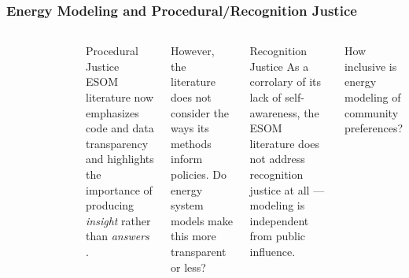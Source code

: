 \begin{frame}
    \frametitle{Energy Modeling and Procedural/Recognition Justice}
    \begin{columns}
        \column[t]{3cm}
        \begin{figure}
            \centering
        \end{figure}
        \column[t]{7cm}
        \begin{block}{Procedural Justice}
            ESOM literature now emphasizes code and data transparency
            \cite{decarolis_formalizing_2017} and highlights the importance of
            producing \textit{insight} rather than \textit{answers}
            \cite{decarolis_using_2011}.
        \end{block}
        \pause
        \begin{block}{}
            However, the literature does not consider the ways its methods
            inform policies. Do energy system models make this more transparent or less?
        \end{block}
        \pause
        \begin{block}{Recognition Justice}
            As a corrolary of its lack of self-awareness, the ESOM literature
            does not address recognition justice at all --- modeling is
            independent from public influence.
        \end{block}
        \begin{block}{}
            How inclusive is energy modeling of community preferences?
        \end{block}
    \end{columns}
    
\end{frame}

